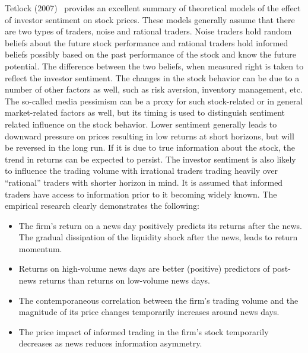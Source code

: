  
 Tetlock (2007)~\cite{tetlock2007giving} provides an excellent summary of theoretical models of the effect of investor sentiment on stock prices. These models generally assume that there are two types of traders, noise and rational traders. Noise traders hold random beliefs about the future stock performance and rational traders hold informed beliefs possibly based on the past performance of the stock and know the future potential. The difference between the two beliefs, when measured right is taken to reflect the investor sentiment. The changes in the stock behavior can be due to a number of other factors as well, such as risk aversion, inventory management, etc. The so-called media pessimism can be a proxy for such stock-related or in general market-related factors as well, but its timing is used to distinguish sentiment related influence on the stock behavior. Lower sentiment generally leads to downward pressure on prices resulting in low returns at short horizons, but will be reversed in the long run. If it is due to true information about the stock, the trend in returns can be expected to persist. The investor sentiment is also likely to influence the trading volume with irrational traders trading heavily over ``rational'' traders with shorter horizon in mind. It is assumed that informed traders have access to information prior to it becoming widely known. The empirical research clearly demonstrates the following:
 	\begin{itemize}
	\item The firm's return on a news day positively predicts its returns after the news. The gradual dissipation of the liquidity shock after the news, leads to return momentum.
	\item Returns on high-volume news days are better (positive) predictors of post-news returns than returns on low-volume news days.
	\item The contemporaneous correlation between the firm's trading volume and the magnitude of its price changes temporarily increases around news days.
	\item The price impact of informed trading in the firm's stock temporarily decreases as news reduces information asymmetry. 
	\end{itemize}
 
